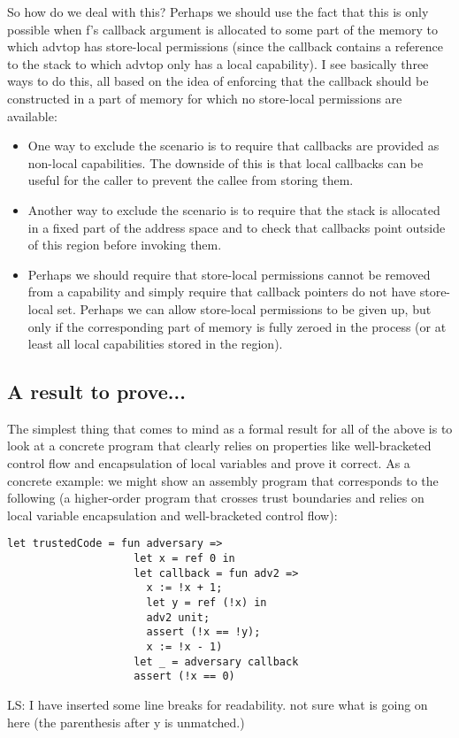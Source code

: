 \documentclass[a4paper]{article}
\newcommand\lau[1]{{\color{purple} \sf \footnotesize {LS: #1}}\\}
\begin{document}
So how do we deal with this? Perhaps we should use the fact that this is only
possible when f's callback argument is allocated to some part of the memory to
which advtop has store-local permissions (since the callback contains a
reference to the stack to which advtop only has a local capability). I see
basically three ways to do this, all based on the idea of enforcing that the
callback should be constructed in a part of memory for which no store-local
permissions are available:
\begin{itemize}
\item One way to exclude the scenario is to require that callbacks are provided
  as non-local capabilities. The downside of this is that local callbacks can be
  useful for the caller to prevent the callee from storing them.
\item Another way to exclude the scenario is to require that the stack is
  allocated in a fixed part of the address space and to check that callbacks
  point outside of this region before invoking them.
\item Perhaps we should require that store-local permissions cannot be removed
  from a capability and simply require that callback pointers do not have
  store-local set. Perhaps we can allow store-local permissions to be given up,
  but only if the corresponding part of memory is fully zeroed in the process
  (or at least all local capabilities stored in the region).
\end{itemize}

\subsection{A result to prove...}
\label{sec:os-less-stack-property}

The simplest thing that comes to mind as a formal result for all of the above is
to look at a concrete program that clearly relies on properties like
well-bracketed control flow and encapsulation of local variables and prove it
correct. As a concrete example: we might show an assembly program that
corresponds to the following (a higher-order program that crosses trust
boundaries and relies on local variable encapsulation and well-bracketed control
flow):
\begin{verbatim}
let trustedCode = fun adversary =>
                    let x = ref 0 in
                    let callback = fun adv2 => 
                      x := !x + 1; 
                      let y = ref (!x) in 
                      adv2 unit; 
                      assert (!x == !y); 
                      x := !x - 1)
                    let _ = adversary callback
                    assert (!x == 0)
\end{verbatim}
\lau{I have inserted some line breaks for readability. not sure what is going on here (the parenthesis after y is unmatched.)}
\end{document}

